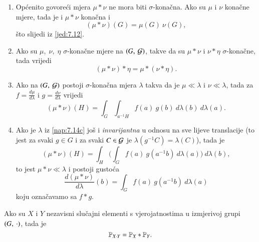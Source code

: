 \begin{nap} \label{nap:7.14}
    \begin{enumerate}[label=(\alph*)]
        \item Op\' cenito govore\' ci mjera $\mu * \nu$ ne mora biti $\sigma$-kona\v cna.
        Ako su $\mu$ i $\nu$ kona\v cne mjere, tada je i $\mu * \nu$ kona\v cna i
        \begin{equation*}
            (\mu * \nu) (G) = \mu (G) \: \nu (G),
        \end{equation*}
        \v sto slijedi iz \eqref{jed:7.12}.
        \item Ako su $\mu, \; \nu, \; \eta$ $\sigma$-kona\v cne mjere na $({G}, \: {\mathcal{G}})$, takve da su $\mu * \nu$ i $\nu * \eta$ $\sigma$-kona\v cne, tada vrijedi
        \begin{equation*}
            (\mu * \nu) * \eta = \mu * (\nu * \eta).
        \end{equation*}
        \item   \label{nap:7.14c}
        Ako na $({G}, \: {\mathcal{G}})$ postoji $\sigma$-kona\v cna mjera $\lambda$ takva da je $\mu \ll \lambda$ i $\nu \ll \lambda$, tada za $f = \frac{d \mu}{d \lambda}$ i $g = \frac{d \nu}{d \lambda}$ vrijedi
        \begin{equation*}
            (\mu * \nu) (H) = \int_G \int_{a^{-1} H} f(a) \: g(b) \: d \lambda (b) \: d \lambda (a).
        \end{equation*}
        \item Ako je $\lambda$ iz \ref{nap:7.14c} jo\v s i \emph{invarijantna} u odnosu na sve lijeve translacije (to jest za svaki $g \in G$ i za svaki $C \in \mathcal{G}$ je $\lambda (g^{-1} C) = \lambda (C)$), tada je
        \begin{equation*}
            (\mu * \nu) (H) = \int_H \Big( \int_G f(a) \: g (a^{-1} b) \: d \lambda (a) \Big) \: d \lambda (b),
        \end{equation*}
        to jest $\mu * \nu \ll \lambda$ i postoji gusto\' ca
        \begin{equation*}
            \frac{d (\mu * \nu)}{d \lambda} (b) = \int_G f(a) \: g (a^{-1} b) \: d \lambda (a)
        \end{equation*}
        koju ozna\v cavamo sa \emph{$f*g$}.
    \end{enumerate}
\end{nap}

\begin{tm}  \label{tm:7.15}
    Ako su $X$ i $Y$ nezavisni slu\v cajni elementi s vjerojatnostima u izmjerivoj grupi $({G}, \: {\cdot})$, tada je
    \begin{equation*}
        \mathbb{P}_{X \cdot Y} = \mathbb{P}_X * \mathbb{P}_Y.
    \end{equation*}
\end{tm}

